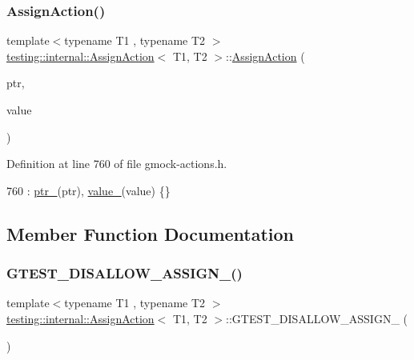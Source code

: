 \subsubsection{\texorpdfstring{Assign\+Action()}{AssignAction()}}
{\footnotesize\ttfamily template$<$typename T1 , typename T2 $>$ \\
\hyperlink{classtesting_1_1internal_1_1AssignAction}{testing\+::internal\+::\+Assign\+Action}$<$ T1, T2 $>$\+::\hyperlink{classtesting_1_1internal_1_1AssignAction}{Assign\+Action} (\begin{DoxyParamCaption}\item[{T1 $\ast$}]{ptr,  }\item[{T2}]{value }\end{DoxyParamCaption})\hspace{0.3cm}{\ttfamily [inline]}}



Definition at line 760 of file gmock-\/actions.\+h.


\begin{DoxyCode}
760 : \hyperlink{classtesting_1_1internal_1_1AssignAction_a49cdab549c200ecac64b348ba27b9d06}{ptr\_}(ptr), \hyperlink{classtesting_1_1internal_1_1AssignAction_a6b76b6b0b0483f2918dab3f2df960dce}{value\_}(value) \{\}
\end{DoxyCode}


\subsection{Member Function Documentation}
\mbox{\label{classtesting_1_1internal_1_1AssignAction_af69bcf574c5453e4120fc770d604ddaa}} 
\subsubsection{\texorpdfstring{G\+T\+E\+S\+T\+\_\+\+D\+I\+S\+A\+L\+L\+O\+W\+\_\+\+A\+S\+S\+I\+G\+N\+\_\+()}{GTEST\_DISALLOW\_ASSIGN\_()}}
{\footnotesize\ttfamily template$<$typename T1 , typename T2 $>$ \\
\hyperlink{classtesting_1_1internal_1_1AssignAction}{testing\+::internal\+::\+Assign\+Action}$<$ T1, T2 $>$\+::G\+T\+E\+S\+T\+\_\+\+D\+I\+S\+A\+L\+L\+O\+W\+\_\+\+A\+S\+S\+I\+G\+N\+\_\+ (\begin{DoxyParamCaption}\item[{\hyperlink{classtesting_1_1internal_1_1AssignAction}{Assign\+Action}$<$ T1, T2 $>$}]{ }\end{DoxyParamCaption})\hspace{0.3cm}{\ttfamily [private]}}

